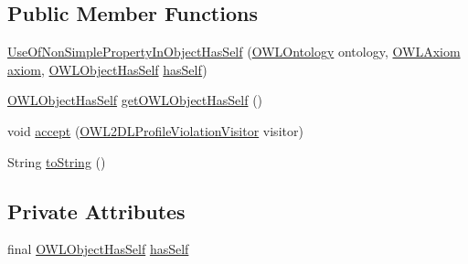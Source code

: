 \subsection*{Public Member Functions}
\begin{DoxyCompactItemize}
\item 
\hyperlink{classorg_1_1semanticweb_1_1owlapi_1_1profiles_1_1_use_of_non_simple_property_in_object_has_self_ad7bed8250bbc09e35d14093a0f4daf18}{Use\-Of\-Non\-Simple\-Property\-In\-Object\-Has\-Self} (\hyperlink{interfaceorg_1_1semanticweb_1_1owlapi_1_1model_1_1_o_w_l_ontology}{O\-W\-L\-Ontology} ontology, \hyperlink{interfaceorg_1_1semanticweb_1_1owlapi_1_1model_1_1_o_w_l_axiom}{O\-W\-L\-Axiom} \hyperlink{classorg_1_1semanticweb_1_1owlapi_1_1profiles_1_1_o_w_l_profile_violation_aa7c8e8910ed3966f64a2c003fb516214}{axiom}, \hyperlink{interfaceorg_1_1semanticweb_1_1owlapi_1_1model_1_1_o_w_l_object_has_self}{O\-W\-L\-Object\-Has\-Self} \hyperlink{classorg_1_1semanticweb_1_1owlapi_1_1profiles_1_1_use_of_non_simple_property_in_object_has_self_afcc32affa07cbcef857ca613dd3fb096}{has\-Self})
\item 
\hyperlink{interfaceorg_1_1semanticweb_1_1owlapi_1_1model_1_1_o_w_l_object_has_self}{O\-W\-L\-Object\-Has\-Self} \hyperlink{classorg_1_1semanticweb_1_1owlapi_1_1profiles_1_1_use_of_non_simple_property_in_object_has_self_a93e9cdc306b1d6b4b8adbb04a17770be}{get\-O\-W\-L\-Object\-Has\-Self} ()
\item 
void \hyperlink{classorg_1_1semanticweb_1_1owlapi_1_1profiles_1_1_use_of_non_simple_property_in_object_has_self_a97c5176f48407da8fb1319c91856c3cb}{accept} (\hyperlink{interfaceorg_1_1semanticweb_1_1owlapi_1_1profiles_1_1_o_w_l2_d_l_profile_violation_visitor}{O\-W\-L2\-D\-L\-Profile\-Violation\-Visitor} visitor)
\item 
String \hyperlink{classorg_1_1semanticweb_1_1owlapi_1_1profiles_1_1_use_of_non_simple_property_in_object_has_self_a2658acb968ad029df5a1e01384fa73bc}{to\-String} ()
\end{DoxyCompactItemize}
\subsection*{Private Attributes}
\begin{DoxyCompactItemize}
\item 
final \hyperlink{interfaceorg_1_1semanticweb_1_1owlapi_1_1model_1_1_o_w_l_object_has_self}{O\-W\-L\-Object\-Has\-Self} \hyperlink{classorg_1_1semanticweb_1_1owlapi_1_1profiles_1_1_use_of_non_simple_property_in_object_has_self_afcc32affa07cbcef857ca613dd3fb096}{has\-Self}
\end{DoxyCompactItemize}


